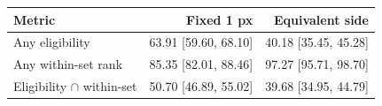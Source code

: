 \begin{tabular}{@{}lrr@{}}
\toprule
Metric & Fixed 1 px & Equivalent side \\
\midrule
Any eligibility & 63.91 [59.60, 68.10] & 40.18 [35.45, 45.28] \\
Any within-set rank & 85.35 [82.01, 88.46] & 97.27 [95.71, 98.70] \\
Eligibility $\cap$ within-set & 50.70 [46.89, 55.02] & 39.68 [34.95, 44.79] \\
\bottomrule
\end{tabular}
